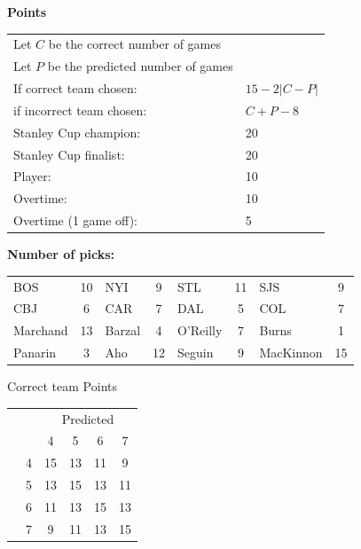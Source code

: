 \documentclass[10pt]{article}
\newcommand{\mccn}[2]{\multicolumn{#1}{c}{#2}}
\begin{document}
{\bf Points}\\
\begin{minipage}{10cm}
    \begin{tabular}{l l}
        Let $C$ be the correct number of games\\
        Let $P$ be the predicted number of games\\
        If correct team chosen:	   & $15 - 2 \left|{C - P}\right|$\\
        if incorrect team chosen:  & $C + P - 8$\\
        Stanley Cup champion:	& 20\\
        Stanley Cup finalist:	& 20\\
        Player:                 & 10\\
        Overtime:               & 10\\
        Overtime (1 game off):  & 5\\
    \end{tabular}

    \vspace{1cm}
    {\bf Number of picks:}\\
    \begin{tabular}{lc | lc | lc | lc }
        BOS & 10 & NYI & 9 & STL & 11 & SJS & 9 \\
        CBJ & 6 & CAR & 7 & DAL & 5 & COL & 7 \\
        Marchand & 13 & Barzal & 4 & O'Reilly & 7 & Burns & 1 \\
        Panarin & 3 & Aho & 12 & Seguin & 9 & MacKinnon & 15 \\
    \end{tabular}
\end{minipage}
\begin{minipage}[t!]{4cm}
    \vspace{-2cm}
    \qquad Correct team Points\\
    \begin{tabular}{c l | c c c c }
        \mccn{2}{} & \mccn{4}{Predicted}\\
        & & 4 & 5 & 6 & 7\\\cline{2-6}
        \parbox[t]{2mm}{} & 4 & 15 & 13 & 11 & 9\\
        & 5 & 13 & 15 & 13 & 11\\
        & 6 & 11 & 13 & 15 & 13\\
        & 7 & 9 & 11 & 13 & 15
    \end{tabular}
\end{minipage}
\end{document}
